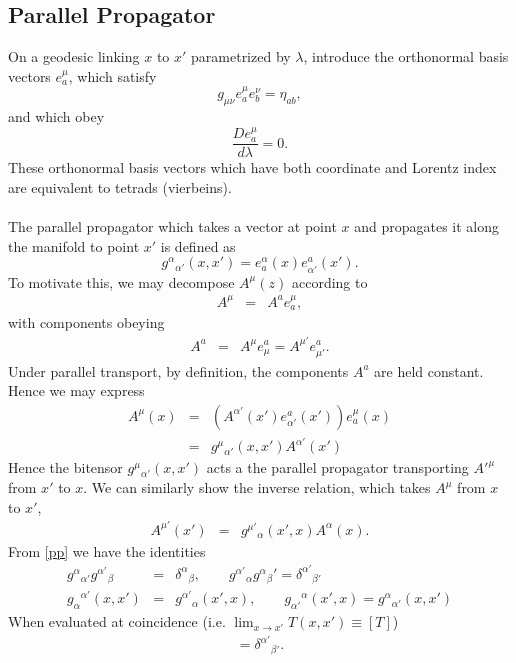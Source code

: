 \documentclass[10pt,letterpaper]{article}
\begin{document}
\subsection{Parallel Propagator}
On a geodesic linking $x$ to $x'$ parametrized by $\lambda$, introduce the orthonormal basis vectors $e^\mu_a$, which satisfy
\begin{equation}
g_{\mu\nu}e^\mu_ae^\nu_b = \eta_{ab},
\end{equation}
and which obey
\begin{equation}
\frac{D e^\mu_a}{d\lambda} = 0.
\end{equation}
These orthonormal basis vectors which have both coordinate and Lorentz index are equivalent to tetrads (vierbeins). 
\\ \\
The parallel propagator which takes a vector at point $x$ and propagates it along the manifold to point $x'$ is defined as
\begin{equation}
g^\alpha{}_{\alpha'}(x,x') = e^\alpha_a(x)e^a_{\alpha'}(x').
\label{pp}
\end{equation}
To motivate this, we may decompose $A^\mu(z)$ according to 
\begin{eqnarray}
A^\mu &=& A^a e^{\mu}_a,
\end{eqnarray}
with components obeying
\begin{eqnarray}
A^a &=& A^\mu e_\mu^a = A^{\mu'} e_{\mu'}^a.
\end{eqnarray}
Under parallel transport, by definition, the components $A^a$ are held constant. Hence we may express
\begin{eqnarray}
A^\mu(x) &=& (A^{\alpha'}(x') e_{\alpha'}^a(x'))e_a^\mu(x)
\nonumber\\
&=& g^{\mu}{}_{\alpha'}(x,x')A^{\alpha'}(x')
\end{eqnarray}
Hence the bitensor $g^{\mu}{}_{\alpha'}(x,x')$ acts a the parallel propagator transporting $A'^\mu$ from $x'$ to $x$. We can similarly show the inverse relation, which takes $A^\mu$ from $x$ to $x'$,
\begin{eqnarray}
A^{\mu'}(x')&=& g^{\mu'}{}_{\alpha}(x',x)A^{\alpha}(x).
\end{eqnarray}
From \eqref{pp} we have the identities
\begin{eqnarray}
g^{\alpha}{}_{\alpha'}g^{\alpha'}{}_\beta &=& \delta^\alpha{}_\beta,\qquad g^{\alpha'}{}_\alpha g^\alpha{}_{\beta}' = \delta^{\alpha'}{}_{\beta'}
\nonumber\\
g_\alpha{}^{\alpha'}(x,x') &=& g^{\alpha'}{}_\alpha(x',x),\qquad g_{\alpha'}{}^\alpha(x',x)=g^{\alpha}{}_{\alpha'}(x,x')
\end{eqnarray}
When evaluated at coincidence (i.e. $\lim_{x\to x'} T(x,x') \equiv [T]$)
\begin{eqnarray}
[g^\alpha{}_{\beta'}]= \delta^{\alpha'}{}_{\beta'}.
\end{eqnarray}
%
\end{document}
